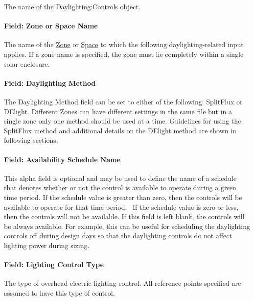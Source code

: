 The name of the Daylighting:Controls object.

\paragraph{Field: Zone or Space Name}\label{daylightingcontrols-field-zone-name}

The name of the \hyperref[zone]{Zone} or \hyperref[space]{Space} to which the following daylighting-related input applies. If a zone name is specified, the zone must lie completely within a single solar enclosure.

\paragraph{Field: Daylighting Method}\label{field-daylighting-method}

The Daylighting Method field can be set to either of the following: SplitFlux or DElight. Different Zones can have different settings in the same file but in a single zone only one method should be used at a time. Guidelines for using the SplitFlux method and additional details on the DElight method are shown in following sections.

\paragraph{Field: Availability Schedule Name}\label{field-availability-schedule-name-002}

This alpha field is optional and may be used to define the name of a schedule that denotes whether or not the control is available to operate during a given time period. If the schedule value is greater than zero, then the controls will be available to operate for that time period.~ If the schedule value is zero or less, then the controls will not be available. If this field is left blank, the controls will be always available. For example, this can be useful for scheduling the daylighting controls off during design days so that the daylighting controls do not affect lighting power during sizing.

\paragraph{Field: Lighting Control Type}\label{field-lighting-control-type}

The type of overhead electric lighting control. All reference points specified are assumed to have this type of control.

